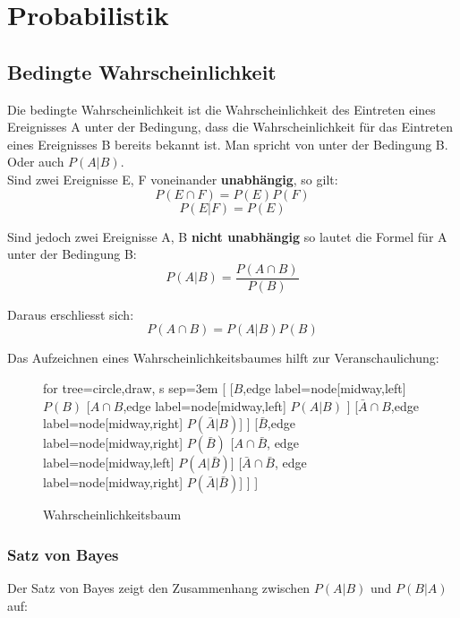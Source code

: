 \newpage
\section{Probabilistik}
\subsection{Bedingte Wahrscheinlichkeit}

Die bedingte Wahrscheinlichkeit ist die Wahrscheinlichkeit des Eintreten eines Ereignisses A unter der Bedingung, dass die Wahrscheinlichkeit für das Eintreten eines Ereignisses B bereits bekannt ist. Man spricht von  unter der Bedingung B\dq. Oder auch $P(A|B)$.\\


Sind zwei Ereignisse E, F voneinander \textbf{unabhängig}, so gilt:
$$ P(E \cap F) = P(E)P(F) $$
$$ P(E|F) = P(E)$$

Sind jedoch zwei Ereignisse A, B \textbf{nicht unabhängig} so lautet die Formel für A unter der Bedingung B:
	$$P(A|B) = \frac{P(A \cap B)}{P(B)}$$


Daraus erschliesst sich:
	$$P(A \cap B) = P(A|B)P(B)$$


Das Aufzeichnen eines Wahrscheinlichkeitsbaumes hilft zur Veranschaulichung: \\

\begin{figure}[H]
	\centering
	\label{fig:probability_tree}
	\begin{forest}
	for tree={circle,draw, s sep=3em}
	[ 
	    [$B$,edge label={node[midway,left] {$P(B)$}}
	      [$A \cap B$,edge label={node[midway,left] {$P(A|B)$}} ] 
	      [$\bar{A} \cap B$,edge label={node[midway,right] {$P(\bar{A}|B)$}}] 
	    ]
	    [$\bar{B}$,edge label={node[midway,right] {$P(\bar{B})$}}
	      [$A \cap \bar{B}$, edge label={node[midway,left] {$P(A|\bar{B})$}}] 
	      [$\bar{A} \cap \bar{B}$, edge label={node[midway,right] {$P(\bar{A}| \bar{B})$}}] 
	  ] 
	]
	\end{forest}
	\caption{Wahrscheinlichkeitsbaum}
\end{figure}

\subsubsection{Satz von Bayes}

Der Satz von Bayes zeigt den Zusammenhang zwischen $P(A|B)$ und $P(B|A)$ auf:

